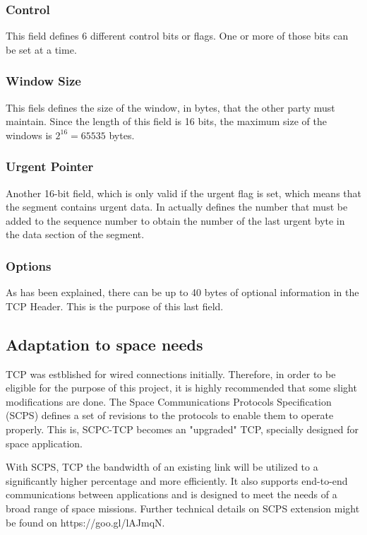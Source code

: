\documentclass[12pt,a4paper]{report}
\begin{document}
\subsubsection{Control}
This field defines 6 different control bits or flags. One or more of those bits can be set at a time. 

\subsubsection{Window Size}
This fiels defines the size of the window, in bytes, that the other party must maintain. Since the length of this field is 16 bits, the maximum size of the windows is $2^{16}=65535$ bytes.  

\subsubsection{Urgent Pointer}
Another 16-bit field, which is only valid if the urgent flag is set, which means that the segment contains urgent data. In actually defines the number that must be added to the sequence number to obtain the number of the last urgent byte in the data section of the segment. 

\subsubsection{Options}
As has been explained, there can be up to 40 bytes of optional information in the TCP Header. This is the purpose of this last field. 

\subsection{Adaptation to space needs}

TCP was estblished for wired connections initially. Therefore, in order to be eligible for the purpose of this project, it is highly recommended that some slight modifications are done. The Space Communications Protocols Specification (SCPS) defines a set of revisions to the protocols to enable them to operate properly. This is, SCPC-TCP becomes an "upgraded" TCP, specially designed for space application.  

With SCPS, TCP the bandwidth of an existing link will be utilized to a significantly higher percentage and more efficiently. It also supports end-to-end communications between applications and is designed to meet the needs of a broad range of space missions. Further technical details on SCPS extension might be found on https://goo.gl/lAJmqN. 
\end{document}
